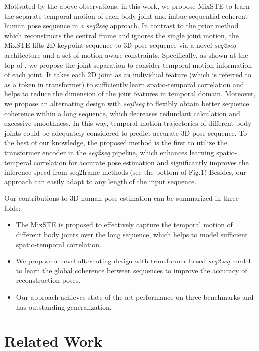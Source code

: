 \documentclass[10pt,twocolumn,letterpaper]{article}
\begin{document}
Motivated by the above observations, in this work, we propose MixSTE to learn the separate temporal motion of each body joint and imbue sequential coherent human pose sequence in a \textit{seq2seq} approach.
In contrast to the prior method~\cite{poseformer} which reconstructs the central frame and ignores the single joint motion, the MixSTE lifts 2D keypoint sequence to 3D pose sequence via a novel \textit{seq2seq} architecture and a set of motion-aware constraints.
	Specifically, as shown at the top of , we propose the joint separation to consider temporal motion information of each joint.
	It takes each 2D joint as an individual feature (which is referred to as a token in transformer) to sufficiently learn spatio-temporal correlation and helps to reduce the dimension of the joint features in temporal domain.
	Moreover, we propose an alternating design with \textit{seq2seq} to flexibly obtain better sequence coherence within a long sequence, which decreases redundant calculation and excessive smoothness.
	In this way, temporal motion trajectories of different body joints could be adequately considered to predict accurate 3D pose sequence.
To the best of our knowledge, the proposed method is the first to utilize the transformer encoder in the \textit{seq2seq} pipeline, which enhances learning spatio-temperal correlation for accurate pose estimation and significantly improves the inference speed from seq2frame methods (see the bottom of Fig.1)
	Besides, our approach can easily adapt to any length of the input sequence. 




Our contributions to 3D human pose estimation can be summarized in three folds:
	\begin{itemize}
		\item The MixSTE is proposed to effectively capture the temporal motion of different body joints over the long sequence, which helps to model sufficient spatio-temporal correlation.
		\item We propose  a novel alternating design with transformer-based \textit{seq2seq} model to learn the global coherence between sequences to improve the accuracy of reconstruction poses.
		\item Our approach achieves state-of-the-art performance on three benchmarks and has outstanding generalization.
	\end{itemize}
	


\section{Related Work}
	\label{sec:rework}
\end{document}
